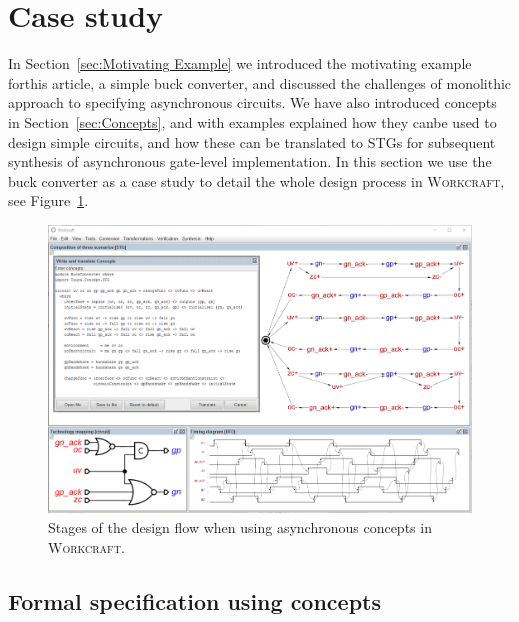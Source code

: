 \documentclass[british, journal]{IEEEtran}
\newcommand{\noun}[1]{\textsc{#1}}
\begin{document}
\vspace{-1mm}
\section{Case study\label{sec:case-study}}

In Section~\ref{sec:Motivating Example} we introduced the motivating example forthis article, a simple buck converter, and discussed the challenges of
monolithic
approach to specifying asynchronous circuits. We have also introduced
concepts in Section~\ref{sec:Concepts}, and with examples explained how they canbe used to design simple circuits, and how these can be translated to STGs
for subsequent synthesis of asynchronous gate-level implementation.
In this section we use the buck converter as a case study to detail the
whole design process in \noun{Workcraft}, see
Figure~\ref{fig:workcraft_screenshot}.

\begin{figure}[t]
\begin{centering}
\includegraphics[scale=0.5]{Images/design_flow_wc_screenshot}
\par\end{centering}

\protect\caption{\label{fig:workcraft_screenshot}Stages of the design flow when
using asynchronous concepts in \noun{Workcraft}.}
\vspace{-4mm}
\end{figure}

\subsection{Formal specification using concepts}
\end{document}
